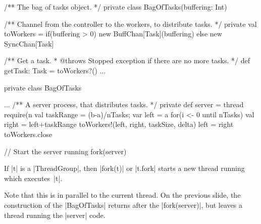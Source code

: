 
\begin{slide}

\begin{scala}
  /** The bag of tasks object. */
  private class BagOfTasks(buffering: Int){
    /** Channel from the controller to the workers, to distribute tasks. */
    private val toWorkers = 
      if(buffering > 0) new BuffChan[Task](buffering) else new SyncChan[Task]

    /** Get a task.  
      * @throws Stopped exception if there are no more tasks. */
    def getTask: Task = toWorkers?()
    ...
  }
\end{scala}
\end{slide}  


\begin{slide}

\begin{scala}
  private class BagOfTasks{
    ...
    /** A server process, that distributes tasks. */
    private def server = thread{
      require(n%
      val taskRange = (b-a)/nTasks; var left = a                  
      for(i <- 0 until nTasks){
        val right = left+taskRange
        toWorkers!(left, right, taskSize, delta)
        left = right
      }
      toWorkers.close
    }

    // Start the server running
    fork(server)
  }
\end{scala}
\end{slide}  


\begin{slide}

If |t| is a |ThreadGroup|, then |fork(t)| or |t.fork| starts a new thread
running which executes~|t|.

Note that this is in parallel to the current thread.  On the previous slide,
the construction of the |BagOfTasks| returns after the |fork(server)|, but
leaves a thread running the |server| code. 
\end{slide}



